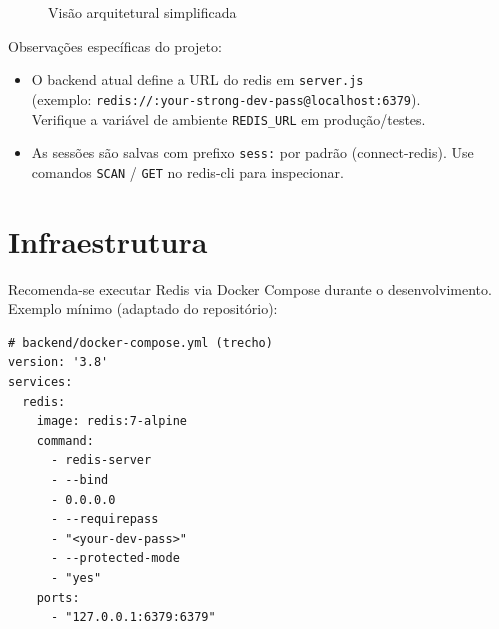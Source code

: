 \documentclass[12pt]{article}
\begin{document}
\begin{figure}[h!]
\centering
{}
\caption{Visão arquitetural simplificada}
\end{figure}

Observações específicas do projeto:
\begin{itemize}
\item O backend atual define a URL do redis em \texttt{server.js}\\
(exemplo: \texttt{redis://:your-strong-dev-pass@localhost:6379}). \\
Verifique a variável de ambiente \texttt{REDIS\_URL} em produção/testes.
\item As sessões são salvas com prefixo \texttt{sess:} por padrão (connect-redis).
Use comandos \texttt{SCAN} / \texttt{GET} no redis-cli para inspecionar.
\end{itemize}

\section{Infraestrutura}
Recomenda-se executar Redis via Docker Compose durante o desenvolvimento. 
Exemplo mínimo (adaptado do repositório):
\begin{verbatim}
# backend/docker-compose.yml (trecho)
version: '3.8'
services:
  redis:
    image: redis:7-alpine
    command:
      - redis-server
      - --bind
      - 0.0.0.0
      - --requirepass
      - "<your-dev-pass>"
      - --protected-mode
      - "yes"
    ports:
      - "127.0.0.1:6379:6379"
\end{verbatim}
\end{document}
